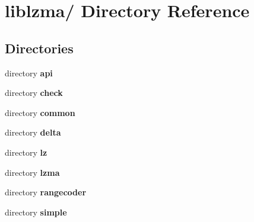 \section{liblzma/ Directory Reference}
\label{dir_2e0898c272e1f0f93c8ef15f5da2a912}
\subsection*{Directories}
\begin{DoxyCompactItemize}
\item 
directory {\bf api}
\item 
directory {\bf check}
\item 
directory {\bf common}
\item 
directory {\bf delta}
\item 
directory {\bf lz}
\item 
directory {\bf lzma}
\item 
directory {\bf rangecoder}
\item 
directory {\bf simple}
\end{DoxyCompactItemize}
